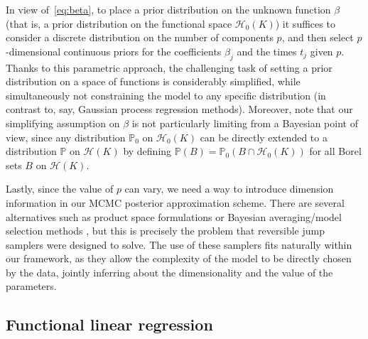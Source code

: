 \documentclass{article}
\numberwithin{equation}{section}
\theoremstyle{plain}
\theoremstyle{definition}
\newcommand{\Hcal}{\mathcal{H}}
\begin{document}
In view of~\eqref{eq:beta}, to place a prior distribution on the unknown function \(\beta\) (that is, a prior distribution on the functional space \(\Hcal_{0}(K)\)) it suffices to consider a discrete distribution on the number of components \(p\), and then select \(p\)-dimensional continuous priors for the coefficients \(\beta_j\) and the times \(t_j\) given \(p\). Thanks to this parametric approach, the challenging task of setting a prior distribution on a space of functions is considerably simplified, while simultaneously not constraining the model to any specific distribution (in contrast to, say, Gaussian process regression methods). Moreover, note that our simplifying assumption on \(\beta\) is not particularly limiting from a Bayesian point of view, since any distribution \(\mathbb{P}_0\) on \(\Hcal_0(K)\) can be directly extended to a distribution \(\mathbb{P}\) on \(\Hcal(K)\) by defining \(\mathbb{P}(B) = \mathbb{P}_0(B\cap \Hcal_0(K))\) for all Borel sets \(B\) on \(\Hcal(K)\).

Lastly, since the value of \(p\) can vary, we need a way to introduce dimension information in our MCMC posterior approximation scheme. There are several alternatives such as product space formulations \citep{carlin1995bayesian} or Bayesian averaging/model selection methods \citep{hoeting1999bayesian}, but this is precisely the problem that reversible jump samplers were designed to solve. The use of these samplers fits naturally within our framework, as they allow the complexity of the model to be directly chosen by the data, jointly inferring about the dimensionality and the value of the parameters.

\subsection{Functional linear regression}\label{sec:rkhs-linear-model}
\end{document}
